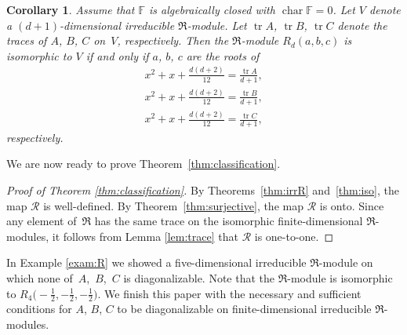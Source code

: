 \documentclass[pdftex]{sigma}
\def\F{\mathbb F}
\numberwithin{equation}{section}
\newtheorem{Corollary}[Theorem]{Corollary}
\begin{document}
\begin{Corollary}\label{cor:inj} Assume that $\F$ is algebraically closed with $\operatorname{char}\F=0$. Let $V$ denote a $(d + 1)$-dimensional irreducible $\Re$-module. Let $\operatorname{tr} A$, $\operatorname{tr} B$, $\operatorname{tr} C$ denote the traces of $A$, $B$, $C$ on~$V$, respectively. Then the $\Re$-module $R_d(a, b, c)$ is isomorphic to $V$ if and only if $a$, $b$, $c$ are the roots of
\begin{gather*}
x^2+x+\frac{d(d+2)}{12}=\frac{\operatorname{tr} A}{d+1},\\
x^2+x+\frac{d(d+2)}{12}=\frac{\operatorname{tr} B}{d+1},\\
x^2+x+\frac{d(d+2)}{12}=\frac{\operatorname{tr} C}{d+1},
\end{gather*}
respectively.
\end{Corollary}

We are now ready to prove Theorem~\ref{thm:classification}.

\begin{proof}[Proof of Theorem \ref{thm:classification}] By Theorems~\ref{thm:irrR} and~\ref{thm:iso}, the map $\mathcal R$ is well-defined. By Theorem~\ref{thm:surjective}, the map $\mathcal R$ is onto. Since any element of~$\Re$ has the same trace on the isomorphic finite-dimensional $\Re$-modules, it follows from Lemma \ref{lem:trace} that $\mathcal R$ is one-to-one.
\end{proof}

In Example \ref{exam:R} we showed a five-dimensional irreducible $\Re$-module on which none of~$A$,~$B$,~$C$ is diagonalizable. Note that the $\Re$-module is isomorphic to $R_4\big({-}\frac{1}{2}, -\frac{1}{2}, -\frac{1}{2}\big)$. We finish this paper with the necessary and sufficient conditions for $A$, $B$, $C$ to be diagonalizable on finite-dimensional irreducible $\Re$-modules.
\end{document}
